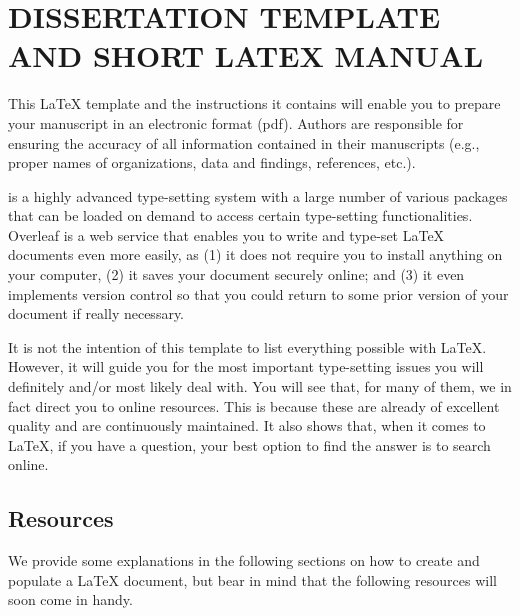 
\chapter{\MakeUppercase{Dissertation Template and Short \LaTeX{} Manual}} %
\label{cha:latex_manual}


This \LaTeX{} template and the instructions it contains will enable you to prepare your manuscript in an electronic format (pdf). 
Authors are responsible for ensuring the accuracy of all information contained in their manuscripts (e.g., proper names of organizations, data and findings, references, etc.).

 is a highly advanced type-setting system with a large number of various packages that can be loaded on demand to access certain type-setting functionalities.
Overleaf is a web service that enables you to write and type-set \LaTeX{} documents even more easily, as (1) it does not require you to install anything on your computer, (2) it saves your document securely online; and (3) it even implements version control so that you could return to some prior version of your document if really necessary.

It is not the intention of this template to list everything possible with \LaTeX. 
However, it will guide you for the most important type-setting issues you will definitely and/or most likely deal with.
You will see that, for many of them, we in fact direct you to online resources. This is because these are already of excellent quality and are continuously maintained. It also shows that, when it comes to \LaTeX{}, if you have a question, your best option to find the answer is to search online.


\section{Resources}
\label{sec:Resources}

We provide some explanations in the following sections on how to create and populate a \LaTeX{} document, 
but bear in mind that the following resources will soon come in handy.

